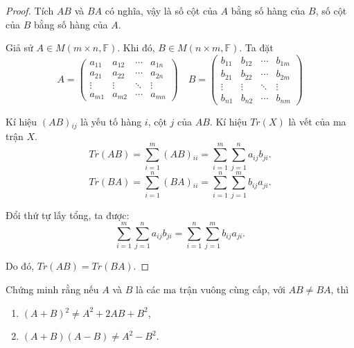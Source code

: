 \documentclass[class=nhvh-linear-algebra,crop=false]{standalone}
\begin{document}
\begin{proof}
    Tích $AB$ và $BA$ có nghĩa, vậy là số cột của $A$ bằng số hàng của $B$, số cột của $B$ bằng số hàng của $A$.
    \par Giả sử $A\in M(m\times n, \mathbb{F})$. Khi đó, $B\in M(n\times m, \mathbb{F})$. Ta đặt
    \[
        A =
        \begin{pmatrix}
            a_{11} & a_{12} & \cdots & a_{1n} \\
            a_{21} & a_{22} & \cdots & a_{2n} \\
            \vdots & \vdots & \ddots & \vdots \\
            a_{m1} & a_{m2} & \cdots & a_{mn}
        \end{pmatrix}
        \quad
        B =
        \begin{pmatrix}
            b_{11} & b_{12} & \cdots & b_{1m} \\
            b_{21} & b_{22} & \cdots & b_{2m} \\
            \vdots & \vdots & \ddots & \vdots \\
            b_{n1} & b_{n2} & \cdots & b_{nm}
        \end{pmatrix}
    \]
    \par Kí hiệu $(AB){}_{ij}$ là yếu tố hàng $i$, cột $j$ của $AB$. Kí hiệu $Tr(X)$ là vết của ma trận $X$.
    \[
        Tr(AB) = \sum^{m}_{i=1}(AB){}_{ii} = \sum^{m}_{i=1}\sum^{n}_{j=1}a_{ij}b_{ji}.
    \]
    \[
        Tr(BA) = \sum^{n}_{i=1}(BA){}_{ii} = \sum^{n}_{i=1}\sum^{m}_{j=1}b_{ij}a_{ji}.
    \]
    \par Đổi thứ tự lấy tổng, ta được:
    \[
        \sum^{m}_{i=1}\sum^{n}_{j=1}a_{ij}b_{ji} = \sum^{n}_{i=1}\sum^{m}_{j=1}b_{ij}a_{ji}.
    \]
    \par Do đó, $Tr(AB) = Tr(BA)$.
\end{proof}

\begin{exercise}
    Chứng minh rằng nếu $A$ và $B$ là các ma trận vuông cùng cấp, với $AB\ne BA$, thì
    \begin{enumerate}[label = (\alph*)]
        \item $(A+B){}^{2}\ne A^{2} + 2AB + B^{2}$,
        \item $(A+B)(A-B)\ne A^{2} - B^{2}$.
    \end{enumerate}
\end{exercise}
\end{document}
